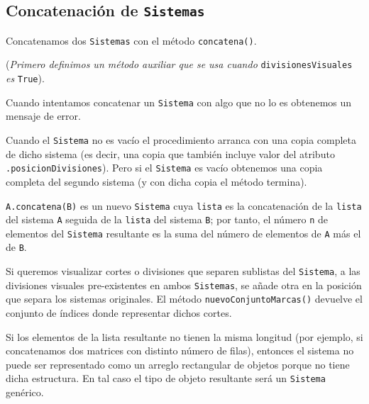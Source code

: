 \documentclass[11pt]{report}
\begin{document}
\subsection{Concatenación de \texttt{Sistemas}}
\label{sec:orgd09ef43}

Concatenamos dos \texttt{Sistemas} con el método \texttt{concatena()}. 

(\emph{Primero definimos un método auxiliar que se usa cuando}
\texttt{divisionesVisuales} \emph{es} \texttt{True}).

Cuando intentamos concatenar un \texttt{Sistema} con algo que no lo es obtenemos
un mensaje de error.

Cuando el \texttt{Sistema} no es vacío el procedimiento arranca con una copia
completa de dicho sistema (es decir, una copia que también incluye
valor del atributo \texttt{.posicionDivisiones}). Pero si el \texttt{Sistema} es
vacío obtenemos una copia completa del segundo sistema (y con dicha
copia el método termina).

\texttt{A.concatena(B)} es un nuevo \texttt{Sistema} cuya \texttt{lista} es la
concatenación de la \texttt{lista} del sistema \texttt{A} seguida de la \texttt{lista} del
sistema \texttt{B}; por tanto, el número \texttt{n} de elementos del \texttt{Sistema}
resultante es la suma del número de elementos de \texttt{A} más el de \texttt{B}.

Si queremos visualizar cortes o divisiones que separen sublistas del
\texttt{Sistema}, a las divisiones visuales pre-existentes en ambos
\texttt{Sistemas}, se añade otra en la posición que separa los sistemas
originales. El método \texttt{nuevoConjuntoMarcas()} devuelve el conjunto de
índices donde representar dichos cortes.

Si los elementos de la lista resultante no tienen la misma longitud
(por ejemplo, si concatenamos dos matrices con distinto número de
filas), entonces el sistema no puede ser representado como un arreglo
rectangular de objetos porque no tiene dicha estructura. En tal caso
el tipo de objeto resultante será un \texttt{Sistema} genérico.
\end{document}
